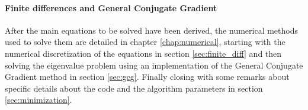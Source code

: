 \paragraph{Finite differences and General Conjugate Gradient} After the main equations to be solved have been derived, the numerical methods used to solve them are detailed in chapter \ref{chap:numerical}, starting with the numerical discretization of the equations in section \ref{sec:finite_diff} and then solving the eigenvalue problem using an implementation of the General Conjugate Gradient method in section \ref{sec:gcg}. Finally closing with some remarks about specific details about the code and the algorithm parameters in section \ref{sec:minimization}.


